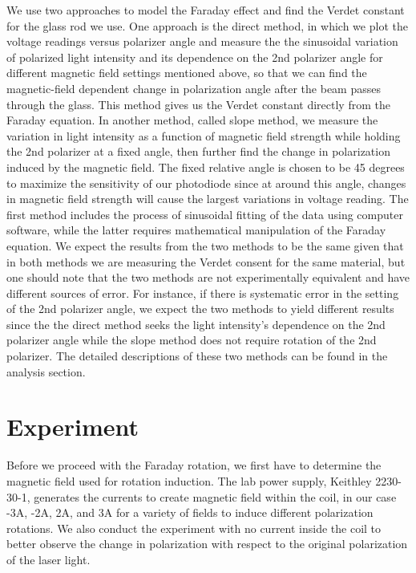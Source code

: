 \documentclass[prb,preprint]{revtex4-1}
\begin{document}
We use two approaches to model the Faraday effect and find the Verdet constant for the glass rod we use. One approach is the direct method, in which we plot the voltage readings versus polarizer angle and measure the the sinusoidal variation of polarized light intensity and its dependence on the 2nd polarizer angle for different magnetic field settings mentioned above, so that we can find the magnetic-field dependent change in polarization angle after the beam passes through the glass. This method gives us the Verdet constant directly from the Faraday equation. In another method, called slope method, we measure the variation in light intensity as a function of magnetic field strength while holding the 2nd polarizer at a fixed angle, then further find the change in polarization induced by the magnetic field. The fixed relative angle is chosen to be 45 degrees to maximize the sensitivity of our photodiode since at around this angle, changes in magnetic field strength will cause the largest variations in voltage reading. The first method includes the process of sinusoidal fitting of the data using computer software, while the latter requires mathematical manipulation of the Faraday equation. We expect the results from the two methods to be the same given that in both methods we are measuring the Verdet consent for the same material, but one should note that the two methods are not experimentally equivalent and have different sources of error. For instance, if there is systematic error in the setting of the 2nd polarizer angle,  we expect the two methods to yield different results since the the direct method seeks the light intensity's dependence on the 2nd polarizer angle while the slope method does not require rotation of the 2nd polarizer. The detailed descriptions of these two methods can be found in the analysis section.

\section{Experiment}

Before we proceed with the Faraday rotation, we first have to determine the magnetic field used for rotation induction. The lab power supply, Keithley 2230-30-1, generates the currents to create magnetic field within the coil, in our case -3A, -2A, 2A, and 3A for a variety of fields to induce different polarization rotations. We also conduct the experiment with no current inside the coil to better observe the change in polarization with respect to the original polarization of the laser light.
\end{document}
